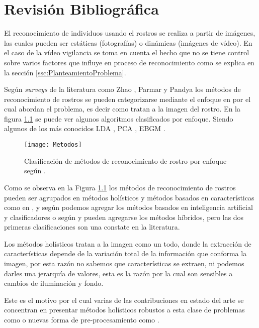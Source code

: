 \chapter{Revisión Bibliográfica} \label{chap:Revision}
El reconocimiento de individuos usando el rostros se realiza a partir de imágenes, las cuales pueden ser estáticas (fotografías) o dinámicas (imágenes de vídeo). En el caso de la vídeo vigilancia se toma en cuenta el hecho que no se tiene control sobre varios factores que influye en proceso de reconocimiento como se explica en la sección \ref{ssc:PlanteamientoProblema}.

Según \textit{surveys} de la literatura como Zhao \cite{zhao2003face}, Parmar \cite{parmar2014face} y Pandya \cite{pandya2013survey} los métodos de reconocimiento de rostros se pueden categorizarse mediante el enfoque en por el cual abordan el problema, es decir como tratan a la imagen del rostro. En la figura \ref{im:metodos} se puede ver algunos algoritmos clasificados por enfoque. Siendo algunos de los más conocidos \acf{LDA} \cite{zhao1999subspace}, \acf{PCA}\cite{turk1991eigenfaces} , \acf{EBGM} \cite{wiskott1997face}. %
\begin{figure}[h]
\center
\texttt{[image: Metodos]}
\caption{Clasificación de métodos de reconocimiento de rostro por enfoque según \cite{zhao2003face}.}
\label{im:metodos}
\end{figure}

Como se observa en la Figura \ref{im:metodos} los métodos de reconocimiento de rostros pueden ser agrupados en métodos holísticos y métodos basados en características como en  \cite{tseng2003comparison} , y según \cite{zhao2003face} podemos agregar los métodos basados en inteligencia artificial y clasificadores o según \cite{parmar2014face} y \cite{pandya2013survey} pueden agregarse los métodos híbridos, pero las dos primeras clasificaciones son una constate en la literatura.

Los métodos holísticos tratan a la imagen como un todo, donde la extracción de características depende de la variación total de la información que conforma la imagen, por esta razón no sabemos que características se extraen, ni podemos darles una jerarquía de valores, esta es la razón por la cual son sensibles a cambios de iluminación y fondo. 

Este es el motivo por el cual varias de las contribuciones en estado del arte se concentran en presentar métodos holísticos robustos a esta clase de problemas como \cite{zhao1999theoretical} o nuevas forma de pre-procesamiento como \cite{gross2003image}.


